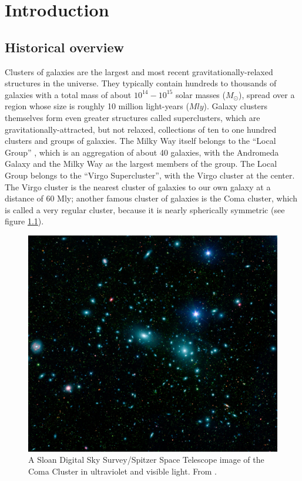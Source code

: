 \chapter{Introduction}
\section{Historical overview}
Clusters of galaxies are the largest and most recent gravitationally-relaxed
structures in the universe. They typically contain hundreds to thousands of
galaxies with a total mass of about $10^{14} - 10^{15}$ solar masses
($\unit{M_{\odot}}$), spread over a region whose size is roughly 10 million
light-years ($\unit{Mly}$). Galaxy clusters themselves form even greater
structures called superclusters, which are gravitationally-attracted, but not
relaxed, collections of ten to one hundred clusters and groups of galaxies. The
Milky
Way itself belongs to the ``Local Group'' , which is an aggregation of
about 40 galaxies, with the Andromeda Galaxy and the Milky Way as the largest
members of
the group. The Local Group belongs to the ``Virgo Supercluster'', with the
Virgo cluster at the center. The Virgo cluster is the nearest cluster of
galaxies to our own galaxy at a distance of 60 Mly; another famous cluster of
galaxies is the Coma cluster, which is called a very regular cluster,
because it is nearly spherically symmetric (see figure \ref{fig:comavis}).
\begin{figure}[tp]
\centering
\includegraphics[width=0.7\linewidth]{chapter1/Comacluster_nasajpl.eps}
\caption{A Sloan Digital Sky Survey/Spitzer Space Telescope image of the Coma
Cluster in ultraviolet and visible light. From \citet{Jenkins2007}.}
\label{fig:comavis}
\end{figure}

